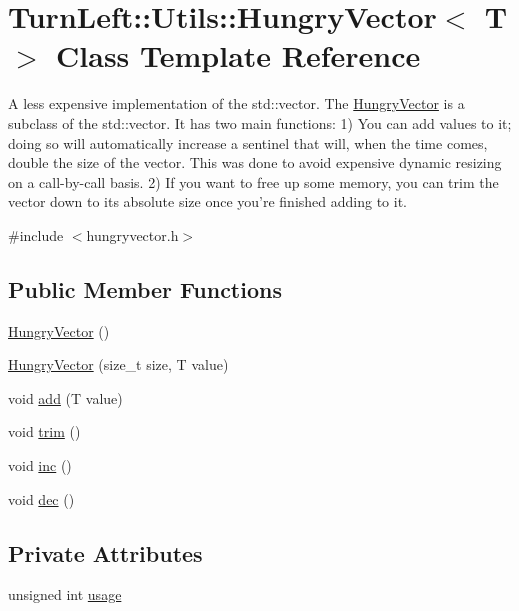 \hypertarget{classTurnLeft_1_1Utils_1_1HungryVector}{
\section{TurnLeft::Utils::HungryVector$<$ T $>$ Class Template Reference}
\label{classTurnLeft_1_1Utils_1_1HungryVector}
}


A less expensive implementation of the std::vector. The \hyperlink{classTurnLeft_1_1Utils_1_1HungryVector}{HungryVector} is a subclass of the std::vector. It has two main functions: 1) You can add values to it; doing so will automatically increase a sentinel that will, when the time comes, double the size of the vector. This was done to avoid expensive dynamic resizing on a call-\/by-\/call basis. 2) If you want to free up some memory, you can trim the vector down to its absolute size once you're finished adding to it.  




{\ttfamily \#include $<$hungryvector.h$>$}

\subsection*{Public Member Functions}
\begin{DoxyCompactItemize}
\item 
\hyperlink{classTurnLeft_1_1Utils_1_1HungryVector_a3f92da70d31c708265ea772783e5453a}{HungryVector} ()
\item 
\hyperlink{classTurnLeft_1_1Utils_1_1HungryVector_a07d3be21e184f8f80cde62d4303fb1d3}{HungryVector} (size\_\-t size, T value)
\item 
void \hyperlink{classTurnLeft_1_1Utils_1_1HungryVector_a9eeefa75b26da7317c0e22929e729464}{add} (T value)
\item 
void \hyperlink{classTurnLeft_1_1Utils_1_1HungryVector_a1f47546497d946f2c5a988f242e4863f}{trim} ()
\item 
void \hyperlink{classTurnLeft_1_1Utils_1_1HungryVector_ade6e0a3c8b5524e487a0c724606d130d}{inc} ()
\item 
void \hyperlink{classTurnLeft_1_1Utils_1_1HungryVector_adf7287a513b121b56f543c6826a4216e}{dec} ()
\end{DoxyCompactItemize}
\subsection*{Private Attributes}
\begin{DoxyCompactItemize}
\item 
unsigned int \hyperlink{classTurnLeft_1_1Utils_1_1HungryVector_a1b1c6ed260138ef704637a7a7ecedf26}{usage}
\end{DoxyCompactItemize}



